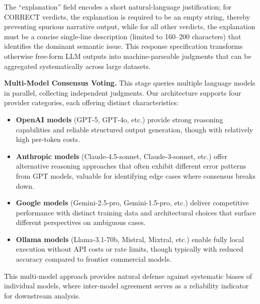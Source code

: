 \documentclass[print]{einformatica}
\begin{document}
The ``explanation'' field encodes a short natural-language justification; for CORRECT verdicts, the explanation is required to be an empty string, thereby preventing spurious narrative output, while for all other verdicts, the explanation must be a concise single-line description (limited to 160--200 characters) that identifies the dominant semantic issue. This response specification transforms otherwise free-form LLM outputs into machine-parseable judgments that can be aggregated systematically across large datasets.

\textbf{Multi-Model Consensus Voting.} This stage queries multiple language models in parallel, collecting independent judgments. Our architecture supports four provider categories, each offering distinct characteristics:

\begin{itemize}
\item \textbf{OpenAI models} (GPT-5, GPT-4o, etc.) provide strong reasoning capabilities and reliable structured output generation, though with relatively high per-token costs.
\item \textbf{Anthropic models} (Claude-4.5-sonnet, Claude-3-sonnet, etc.) offer alternative reasoning approaches that often exhibit different error patterns from GPT models, valuable for identifying edge cases where consensus breaks down.
\item \textbf{Google models} (Gemini-2.5-pro, Gemini-1.5-pro, etc.) deliver competitive performance with distinct training data and architectural choices that surface different perspectives on ambiguous cases.
\item \textbf{Ollama models} (Llama-3.1-70b, Mistral, Mixtral, etc.) enable fully local execution without API costs or rate limits, though typically with reduced accuracy compared to frontier commercial models.
\end{itemize}

This multi-model approach provides natural defense against systematic biases of individual models, where inter-model agreement serves as a reliability indicator for downstream analysis.
\end{document}
